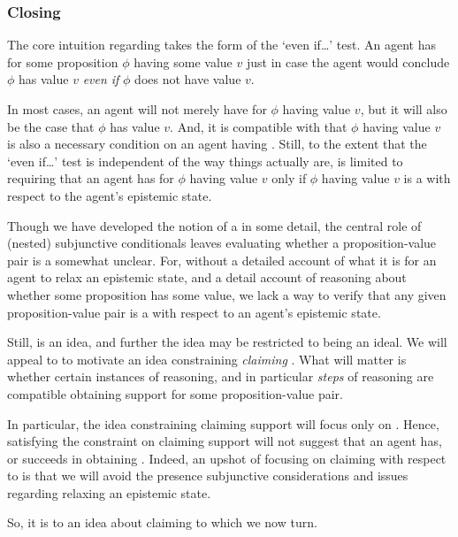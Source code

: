 \subsubsection{Closing \ideaS{}}
\label{sec:ideaS:closing}

\begin{note}
  The core intuition regarding \support{} takes the form of the `even if\dots' test.
  An agent has \support{} for some proposition \(\phi\) having some value \(v\) just in case the agent would conclude \(\phi\) has value \(v\) \emph{even if} \(\phi\) does not have value \(v\).

  In most cases, an agent will not merely have \support{} for \(\phi\) having value \(v\), but it will also be the case that \(\phi\) has value \(v\).
  And, it is compatible with \ideaS{} that \(\phi\) having value \(v\) is also a necessary condition on an agent having \support{}.
  Still, to the extent that the `even if\dots' test is independent of the way things actually are, \ideaS{} is limited to requiring that an agent has \support{} for \(\phi\) having value \(v\) only if \(\phi\) having value \(v\) is a \sink{} with respect to the agent's epistemic state.

  Though we have developed the notion of a \sink{} in some detail, the central role of (nested) subjunctive conditionals leaves evaluating whether a proposition-value pair is a \sink{} somewhat unclear.
  For, without a detailed account of what it is for an agent to relax an epistemic state, and a detail account of reasoning about whether some proposition has some value, we lack a way to verify that any given proposition-value pair is a \sink{} with respect to an agent's epistemic state.

  Still, \ideaS{} is an idea, and further the idea may be restricted to being an ideal.
  We will appeal to \ideaS{} to motivate an idea constraining \emph{claiming} \support{}.
  What will matter is whether certain instances of reasoning, and in particular \emph{steps} of reasoning are compatible obtaining support for some proposition-value pair.

  In particular, the idea constraining claiming support will focus only on .
  Hence, satisfying the constraint on claiming support will not suggest that an agent has, or succeeds in obtaining \support{}.
  Indeed, an upshot of focusing on claiming with respect to  is that we will avoid the presence subjunctive considerations and issues regarding relaxing an epistemic state.

  So, it is to an idea about claiming \support{} to which we now turn.
\end{note}

